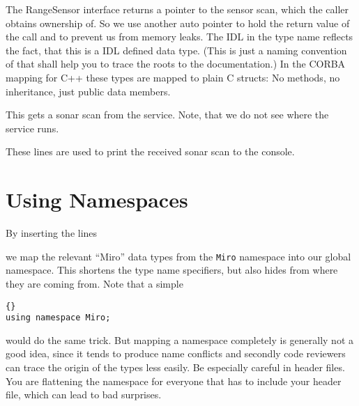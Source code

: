 

The RangeSensor interface returns a pointer to the sensor scan, which
the caller obtains ownership of. So we use another auto pointer to
hold the return value of the call and to prevent us from memory leaks.
The IDL in the type name reflects the fact, that this is a IDL defined
data type. (This is just a naming convention of \miro that shall help
you to trace the roots to the documentation.) In the CORBA mapping for
C++ these types are mapped to plain C structs: No methods, no
inheritance, just public data members.



This gets a sonar scan from the service. Note, that we do not see where
the service runs.



These lines are used to print the received sonar scan to the
console.

%




\section{Using Namespaces}

By inserting the lines



we map the relevant ``Miro'' data types from the \lstinline!Miro!
namespace into our global namespace. This shortens the type name
specifiers, but also hides from where they are coming from. Note that
a simple

\begin{lstlisting}[frame=tb]{}
using namespace Miro;
\end{lstlisting}

would do the same trick. But mapping a namespace completely is
generally not a good idea, since it tends to produce name conflicts
and secondly code reviewers can trace the origin of the types less
easily. Be especially careful in header files. You are flattening the
namespace for everyone that has to include your header file, which can
lead to bad surprises.

